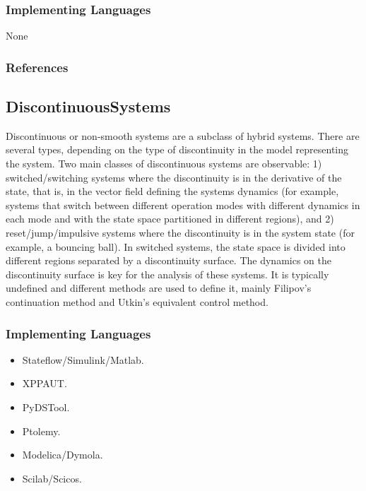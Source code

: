 \subsubsection{Implementing Languages}

None


\subsubsection{References}


\cite{Barros:2003:DSM}

\subsection{DiscontinuousSystems}
\label{subsecF:SwitchingSystems}


Discontinuous or non-smooth systems are a subclass of hybrid systems. There are several types, depending on the type of discontinuity in the model representing the system. Two main classes of discontinuous systems are observable: 1) switched/switching systems  where the discontinuity is in the derivative of the state, that is, in the vector field defining the systems dynamics (for example, systems that switch between different operation modes with different dynamics in each mode and with the state space partitioned in different regions), and 2) reset/jump/impulsive systems where the discontinuity is in the system state (for example, a bouncing ball). In switched systems, the state space is divided into different regions separated by a discontinuity surface. The dynamics on the discontinuity surface is key for the analysis of these systems. It is typically undefined and different methods are used to define it, mainly Filipov's continuation method and Utkin's equivalent control method. 

\subsubsection{Implementing Languages}


\begin{itemize}
    \item Stateflow/Simulink/Matlab.
    \item XPPAUT.
    \item PyDSTool.
    \item Ptolemy.
    \item Modelica/Dymola.
    \item Scilab/Scicos.
\end{itemize}



